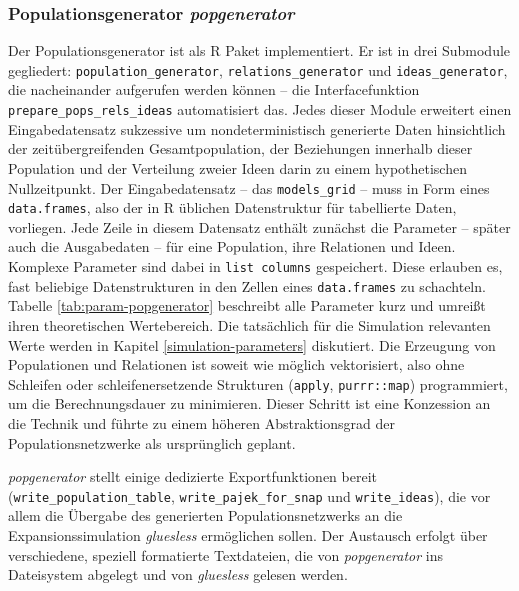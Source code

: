 \documentclass[openany,twoside,twocolumn]{book}
\begin{document}
\hypertarget{popgenerator}{%
\subsubsection{\texorpdfstring{Populationsgenerator
\emph{popgenerator}}{Populationsgenerator popgenerator}}\label{popgenerator}}

Der Populationsgenerator ist als R Paket implementiert. Er ist in drei
Submodule gegliedert: \texttt{population\_generator},
\texttt{relations\_generator} und \texttt{ideas\_generator}, die
nacheinander aufgerufen werden können -- die Interfacefunktion
\texttt{prepare\_pops\_rels\_ideas} automatisiert das. Jedes dieser
Module erweitert einen Eingabedatensatz sukzessive um nondeterministisch
generierte Daten hinsichtlich der zeitübergreifenden Gesamtpopulation,
der Beziehungen innerhalb dieser Population und der Verteilung zweier
Ideen darin zu einem hypothetischen Nullzeitpunkt. Der Eingabedatensatz
-- das \texttt{models\_grid} -- muss in Form eines \texttt{data.frames},
also der in R üblichen Datenstruktur für tabellierte Daten, vorliegen.
Jede Zeile in diesem Datensatz enthält zunächst die Parameter -- später
auch die Ausgabedaten -- für eine Population, ihre Relationen und Ideen.
Komplexe Parameter sind dabei in \texttt{list\ columns} gespeichert.
Diese erlauben es, fast beliebige Datenstrukturen in den Zellen eines
\texttt{data.frames} zu schachteln. Tabelle \ref{tab:param-popgenerator}
beschreibt alle Parameter kurz und umreißt ihren theoretischen
Wertebereich. Die tatsächlich für die Simulation relevanten Werte werden
in Kapitel \ref{simulation-parameters} diskutiert. Die Erzeugung von
Populationen und Relationen ist soweit wie möglich vektorisiert, also
ohne Schleifen oder schleifenersetzende Strukturen (\texttt{apply},
\texttt{purrr::map}) programmiert, um die Berechnungsdauer zu
minimieren. Dieser Schritt ist eine Konzession an die Technik und führte
zu einem höheren Abstraktionsgrad der Populationsnetzwerke als
ursprünglich geplant.

\emph{popgenerator} stellt einige dedizierte Exportfunktionen bereit
(\texttt{write\_population\_table}, \texttt{write\_pajek\_for\_snap} und
\texttt{write\_ideas}), die vor allem die Übergabe des generierten
Populationsnetzwerks an die Expansionssimulation \emph{gluesless}
ermöglichen sollen. Der Austausch erfolgt über verschiedene, speziell
formatierte Textdateien, die von \emph{popgenerator} ins Dateisystem
abgelegt und von \emph{gluesless} gelesen werden.
\end{document}
